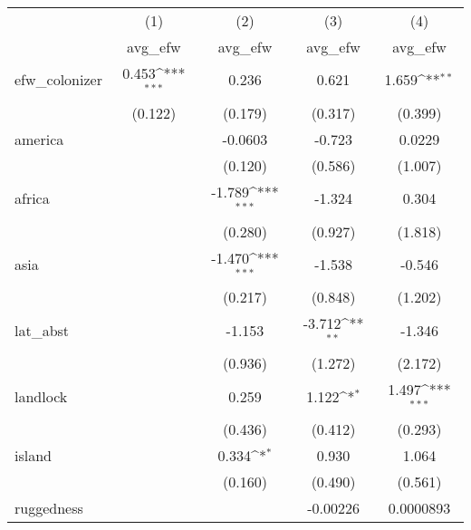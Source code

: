 {
\def\sym#1{\ifmmode^{#1}\else\(^{#1}\)\fi}
\begin{tabular}{l*{4}{c}}
\hline\hline
            &\multicolumn{1}{c}{(1)}&\multicolumn{1}{c}{(2)}&\multicolumn{1}{c}{(3)}&\multicolumn{1}{c}{(4)}\\
            &\multicolumn{1}{c}{avg\_efw}&\multicolumn{1}{c}{avg\_efw}&\multicolumn{1}{c}{avg\_efw}&\multicolumn{1}{c}{avg\_efw}\\
\hline
efw\_colonizer&       0.453\sym{***}&       0.236         &       0.621         &       1.659\sym{**} \\
            &     (0.122)         &     (0.179)         &     (0.317)         &     (0.399)         \\
[1em]
america     &                     &     -0.0603         &      -0.723         &      0.0229         \\
            &                     &     (0.120)         &     (0.586)         &     (1.007)         \\
[1em]
africa      &                     &      -1.789\sym{***}&      -1.324         &       0.304         \\
            &                     &     (0.280)         &     (0.927)         &     (1.818)         \\
[1em]
asia        &                     &      -1.470\sym{***}&      -1.538         &      -0.546         \\
            &                     &     (0.217)         &     (0.848)         &     (1.202)         \\
[1em]
lat\_abst    &                     &      -1.153         &      -3.712\sym{**} &      -1.346         \\
            &                     &     (0.936)         &     (1.272)         &     (2.172)         \\
[1em]
landlock    &                     &       0.259         &       1.122\sym{*}  &       1.497\sym{***}\\
            &                     &     (0.436)         &     (0.412)         &     (0.293)         \\
[1em]
island      &                     &       0.334\sym{*}  &       0.930         &       1.064         \\
            &                     &     (0.160)         &     (0.490)         &     (0.561)         \\
[1em]
ruggedness  &                     &                     &    -0.00226         &   0.0000893         \\

\end{tabular}}
